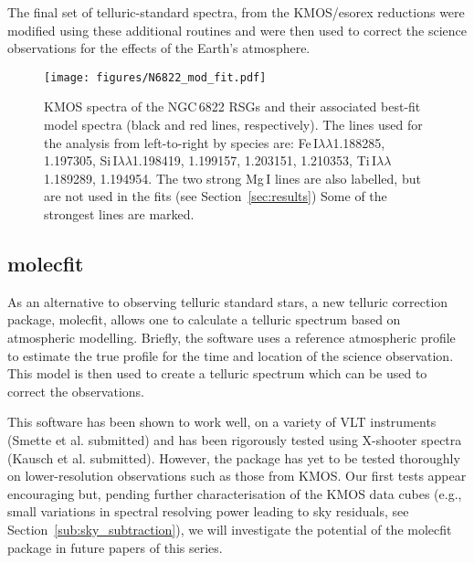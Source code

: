 \documentclass[iop]{emulateapj}
\begin{document}
The final set of telluric-standard spectra,
from the KMOS/esorex reductions were modified using these additional routines and were then used to correct the science observations for the effects of the Earth's atmosphere.



\begin{figure*}
 \begin{center}
\texttt{[image: figures/N6822\_mod\_fit.pdf]}
\caption{KMOS spectra of the NGC\,6822 RSGs and their associated best-fit model spectra
(black and red lines, respectively).
The lines used for the analysis from left-to-right by species are:
Fe\,I$\lambda\lambda$1.188285,
1.197305,
Si\,I$\lambda\lambda$1.198419,
1.199157,
1.203151,
1.210353,
Ti\,I$\lambda\lambda$1.189289,
1.194954.
The two strong Mg\,I lines are also labelled, but are not used in the fits
(see Section~\ref{sec:results})
Some of the strongest lines are marked.
         }
\label{fig:model_fits}
\end{center}
\end{figure*}


\subsection{{\sc molecfit}} %
\label{sub:molecfit}

As an alternative to observing telluric standard stars, a new telluric correction package, {\sc molecfit}, allows one to calculate a telluric spectrum based on atmospheric modelling.
Briefly, the software uses a reference atmospheric profile to estimate the true profile for the time and location of the science observation.
This model is then used to create a telluric spectrum which can be used to correct the observations.

This software has been shown to work well, on a variety of VLT instruments
(Smette et al. submitted) and has been rigorously tested using X-shooter spectra
(Kausch et al. submitted).
However, the package has yet to be tested thoroughly on lower-resolution observations such as those from KMOS.
Our first tests appear encouraging but, pending further characterisation of the KMOS data cubes
(e.g., small variations in spectral resolving power leading to sky residuals,
see Section~\ref{sub:sky_subtraction}),
we will investigate the potential of the {\sc molecfit} package in future papers of this series.
\end{document}
